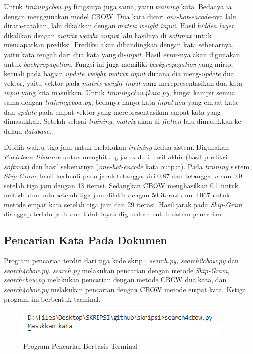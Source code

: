 \documentclass[12pt]{report}
\begin{document}
Untuk \textit{trainingcbow.py} fungsinya juga sama, yaitu \textit{training} kata. Bedanya ia dengan menggunakan model CBOW. Dua kata dicari \textit{one-hot-encode}-nya lalu dirata-ratakan, lalu dikalikan dengan \textit{matrix weight input}. Hasil \textit{hidden layer} dikalikan dengan \textit{matrix weight output} lalu hasilnya di \textit{softmax} untuk mendapatkan prediksi. Prediksi akan dibandingkan dengan kata sebenarnya, yaitu kata tengah dari dua kata yang di-\textit{input}. Hasil \textit{error}-nya akan digunakan untuk \textit{backpropagation}. Fungsi ini juga memiliki \textit{backpropagation} yang mirip, kecuali pada bagian \textit{update weight matrix input} dimana dia meng-\textit{update} dua vektor, yaitu vektor pada \textit{matrix weight input} yang merepresentasikan dua kata \textit{input} yang kita masukkan. Untuk \textit{trainingcbow4kata.py}, fungsi hampir semua sama dengan \textit{trainingcbow.py}, bedanya hanya kata \textit{input}-nya yang empat kata dan \textit{update} pada empat vektor yang merepresentasikan empat kata yang dimasukkan. Setelah selesai \textit{training}, \textit{matrix} akan di \textit{flatten} lalu dimasukkan ke dalam \textit{database}.

Dipilih waktu tiga jam untuk melakukan \textit{training} kedua sistem. Digunakan \textit{Euclidean Distance} untuk menghitung jarak dari hasil akhir (hasil prediksi \textit{softmax}) dan hasil sebenarnya (\textit{one-hot-encode} kata output). Pada \textit{training} sistem \textit{Skip-Gram}, hasil berhenti pada jarak tetangga kiri 0.87 dan tetangga kanan 0.9 setelah tiga jam dengan 43 iterasi. Sedangkan CBOW menghasilkan 0.1 untuk metode dua kata setelah tiga jam dilatih dengan 50 iterasi dan 0.067 untuk metode empat kata setelah tiga jam dan 29 iterasi. Hasil jarak pada \textit{Skip-Gram} dianggap terlalu jauh dan tidak layak digunakan untuk sistem pencarian.

\subsection{Pencarian Kata Pada Dokumen}
Program pencarian terdiri dari tiga kode skrip : \textit{search.py, search2cbow.py} dan \textit{search4cbow.py}. \textit{search.py} melakukan pencarian dengan metode \textit{Skip-Gram}, \textit{searchcbow.py} melakukan pencarian dengan metode CBOW dua kata, dan \textit{search4cbow.py} melakukan pencarian dengan CBOW metode empat kata. Ketiga program ini berbentuk terminal.

\begin{figure}[H]
\centering
\includegraphics[scale=0.75]{prompt_user}
\caption{Program Pencarian Berbasis Terminal}
\label{promptuser}
\end{figure}
\end{document}
